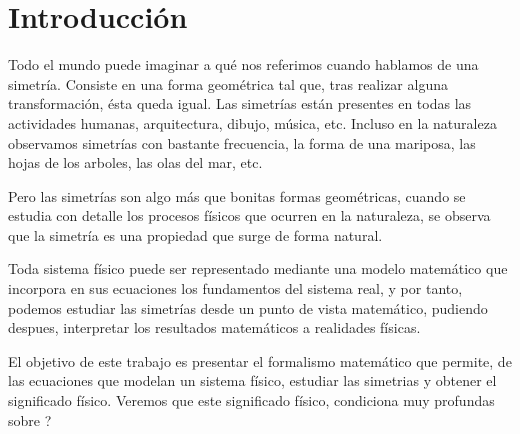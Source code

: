 \section{Introducción}\label{sec:introduccion}

Todo el mundo puede imaginar a qué nos referimos cuando hablamos de una simetría.
Consiste en una forma geométrica tal que, tras realizar alguna transformación, ésta queda igual.
Las simetrías están presentes en todas las actividades humanas, arquitectura, dibujo, música, etc.
Incluso en la naturaleza observamos simetrías con bastante frecuencia, la forma de una mariposa, las hojas de los arboles, las olas del mar, etc.

Pero las simetrías son algo más que bonitas formas geométricas, cuando se estudia con detalle los procesos físicos que ocurren en la naturaleza, se observa que la simetría es una propiedad que surge de forma natural.

Toda sistema físico puede ser representado mediante una modelo matemático que incorpora en sus ecuaciones los fundamentos del sistema real, y por tanto, podemos estudiar las simetrías desde un punto de vista matemático, pudiendo despues, interpretar los resultados matemáticos a realidades físicas.

El objetivo de este trabajo es presentar el formalismo matemático que permite, de las ecuaciones que modelan un sistema físico, estudiar las simetrias y obtener el significado físico.
Veremos que este significado físico, condiciona  muy profundas sobre ?



